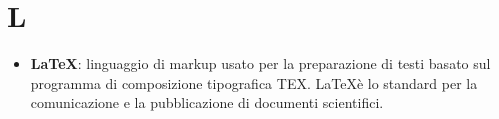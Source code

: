 \newpage
\section{L}

\begin{itemize}
	\item \textbf{LaTeX}: linguaggio di markup usato per la preparazione di testi basato sul programma di composizione tipografica TEX. \LaTeX è lo standard per la comunicazione e la pubblicazione di documenti scientifici.
\end{itemize}
